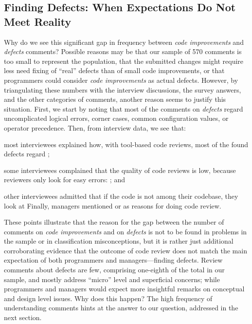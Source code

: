 \subsection{Finding Defects: When Expectations Do Not Meet Reality}

Why do we see this significant gap in frequency between \emph{code improvements} and \emph{defects} comments? Possible reasons may be that our sample of 570 comments is too small to represent the population, that the submitted changes might require less need fixing of ``real'' defects than of small code improvements, or that programmers could consider \emph{code improvements} as actual defects. However, by triangulating these numbers with the interview discussions, the survey answers, and the other categories of comments, another reason seems to justify this situation. First, we start by noting that most of the comments on \emph{defects} regard uncomplicated logical errors, \eg corner cases, common configuration values, or operator precedence. Then, from interview data, we see that: \begin{inparaenum}[(1)]
\item most interviewees explained how, with tool-based code reviews, most of the found defects regard ; 
\item some interviewees complained that the quality of code reviews is low, because reviewers only look for easy errors: ; and 
\item other interviewees admitted that if the code is not among their codebase, they look at  Finally, managers mentioned  or  as reasons for doing code review.
\end{inparaenum}
These points illustrate that the reason for the gap between the number of comments on \emph{code improvements} and on \emph{defects} is not to be found in problems in the sample or in classification misconceptions, but it is rather just additional corroborating evidence that the outcome of code review does not match the main expectation of both programmers and managers—finding defects. Review comments about defects are few, comprising one-eighth of the total in our sample, and mostly address ``micro'' level and superficial concerns; while programmers and managers would expect more insightful remarks on conceptual and design level issues. Why does this happen? The high frequency of understanding comments hints at the answer to our question, addressed in the next section.
